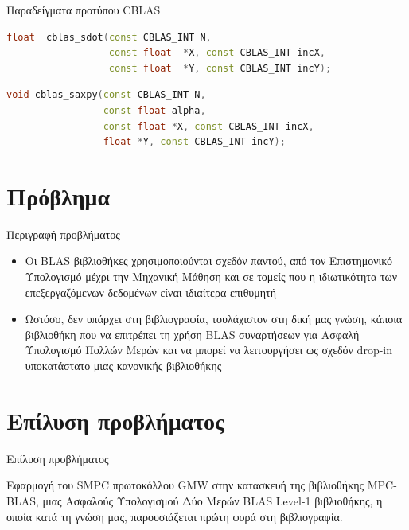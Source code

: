 \documentclass[10pt]{beamer}
\begin{document}
    \begin{frame}[fragile]{Παραδείγματα προτύπου CBLAS}

        \begin{block}{}
            \begin{lstlisting}[firstnumber=1, xleftmargin=10pt, language=C++]
float  cblas_sdot(const CBLAS_INT N,
                  const float  *X, const CBLAS_INT incX,
                  const float  *Y, const CBLAS_INT incY);
            \end{lstlisting}
        \end{block}
        \begin{block}{}
            \begin{lstlisting}[firstnumber=1, xleftmargin=10pt, language=C++]
void cblas_saxpy(const CBLAS_INT N,
                 const float alpha,
                 const float *X, const CBLAS_INT incX,
                 float *Y, const CBLAS_INT incY);
            \end{lstlisting}
        \end{block}

    \end{frame}

    \section{Πρόβλημα}
    \begin{frame}[c]{Περιγραφή προβλήματος}
        \centering
        \begin{block}{}
            \begin{itemize}
                \item Οι BLAS βιβλιοθήκες χρησιμοποιούνται σχεδόν παντού, από τον Επιστημονικό Υπολογισμό μέχρι την Μηχανική Μάθηση και σε τομείς που η ιδιωτικότητα των επεξεργαζόμενων δεδομένων είναι ιδιαίτερα επιθυμητή
                \item Ωστόσο, δεν υπάρχει στη βιβλιογραφία, τουλάχιστον στη δική μας γνώση, κάποια βιβλιοθήκη που να επιτρέπει τη χρήση BLAS συναρτήσεων για Ασφαλή Υπολογισμό Πολλών Μερών και να μπορεί να λειτουργήσει ως σχεδόν drop-in υποκατάστατο μιας κανονικής βιβλιοθήκης
            \end{itemize}
        \end{block}
    \end{frame}

    \section{Επίλυση προβλήματος}
    \begin{frame}[c]{Επίλυση προβλήματος}
        \centering
        \begin{block}{}
            Εφαρμογή του SMPC πρωτοκόλλου GMW στην κατασκευή της βιβλιοθήκης MPC-BLAS, μιας Ασφαλούς Υπολογισμού Δύο Μερών BLAS Level-1 βιβλιοθήκης, η οποία κατά τη γνώση μας, παρουσιάζεται πρώτη φορά στη βιβλιογραφία.
        \end{block}
    \end{frame}
\end{document}

